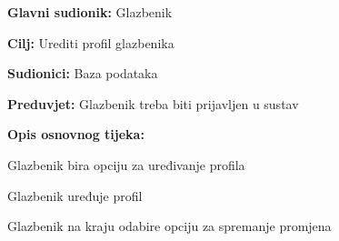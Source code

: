 	\noindent {}
	\begin{packed_item}
		
		\item \textbf{Glavni sudionik: } Glazbenik
		\item  \textbf{Cilj:} Urediti profil glazbenika
		\item  \textbf{Sudionici:} Baza podataka
		\item  \textbf{Preduvjet:} Glazbenik treba biti prijavljen u sustav
		\item  \textbf{Opis osnovnog tijeka:}
		
		\item[] \begin{packed_enum}
			
			\item Glazbenik bira opciju za uređivanje profila
			\item Glazbenik uređuje profil
			\item Glazbenik na kraju odabire opciju za spremanje promjena
		\end{packed_enum}
		
		
	\end{packed_item}
	

